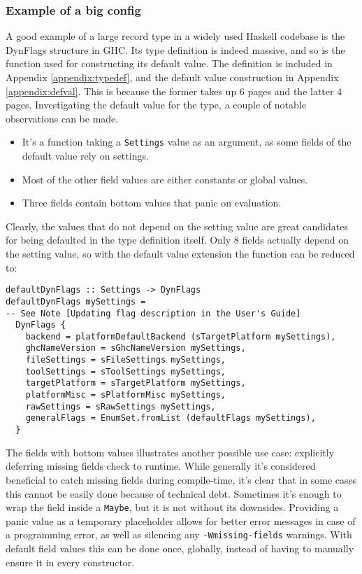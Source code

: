\documentclass[en]{pracamgr}
\begin{document}
\subsubsection{Example of a big config}
A good example of a large record type in a widely used Haskell codebase is the DynFlags structure in GHC.
Its type definition is indeed massive, and so is the function used for constructing its default value.
The definition is included in Appendix \ref{appendix:typedef}, and the default value construction in Appendix \ref{appendix:defval}.
This is because the former takes up 6 pages and the latter 4 pages.
Investigating the default value for the type, a couple of notable observations can be made.
\begin{itemize}
  \item It's a function taking a \texttt{Settings} value as an argument, as some fields of the default value rely on settings.
  \item Most of the other field values are either constants or global values.
  \item Three fields contain bottom values that panic on evaluation.
\end{itemize}
Clearly, the values that do not depend on the setting value are great candidates for being defaulted in the type definition itself.
Only 8 fields actually depend on the setting value, so with the default value extension the function can be reduced to:
\begin{lstlisting}
defaultDynFlags :: Settings -> DynFlags
defaultDynFlags mySettings =
-- See Note [Updating flag description in the User's Guide]
  DynFlags {
    backend = platformDefaultBackend (sTargetPlatform mySettings),
    ghcNameVersion = sGhcNameVersion mySettings,
    fileSettings = sFileSettings mySettings,
    toolSettings = sToolSettings mySettings,
    targetPlatform = sTargetPlatform mySettings,
    platformMisc = sPlatformMisc mySettings,
    rawSettings = sRawSettings mySettings,
    generalFlags = EnumSet.fromList (defaultFlags mySettings),
  }
\end{lstlisting}
The fields with bottom values illustrates another possible use case: explicitly deferring missing fields check to runtime.
While generally it's considered beneficial to catch missing fields during compile-time, it's clear that in some cases this cannot be easily done
because of technical debt. Sometimes it's enough to wrap the field inside a \texttt{Maybe}, but it is not without its downsides.
Providing a panic value as a temporary placeholder allows for better error messages in case of a programming error, as well as silencing any 
\texttt{-Wmissing-fields} warnings. With default field values this can be done once, globally, instead of having to manually ensure it in every constructor.
\end{document}
